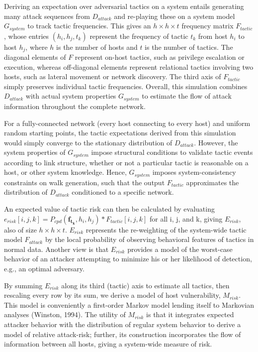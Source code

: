 \documentclass[journal]{IEEEtran}
\begin{document}
Deriving an expectation over adversarial tactics on a system entails generating many attack sequences from $D_{attack}$ and re-playing these on a system model $G_{system}$ to track tactic frequencies. This gives an $h\times h\times t$ frequency matrix $F_{tactic}$, whose entries $(h_{i},h_{j},t_{k} )$ represent the frequency of tactic $t_{k}$ from host $h_{i}$ to host $h_{j}$, where $h$ is the number of hosts and $t$ is the number of tactics. The diagonal elements of $F$ represent on-host tactics, such as privilege escalation or execution, whereas off-diagonal elements represent relational tactics involving two hosts, such as lateral movement or network discovery. The third axis of $F_{tactic}$ simply preserves individual tactic frequencies. Overall, this simulation combines $D_{attack}$ with actual system properties $G_{system}$ to estimate the flow of attack information throughout the complete network.

For a fully-connected network (every host connecting to every host) and uniform random starting points, the tactic expectations derived from this simulation would simply converge to the stationary distribution of $D_{attack}$. However, the system properties of $G_{system}$ impose structural conditions to validate tactic events according to link structure, whether or not a particular tactic is reasonable on a host, or other system knowledge. Hence, $G_{system}$ imposes system-consistency constraints on walk generation, such that the output $F_{tactic}$ approximates the distribution of $D_{attack}$ conditioned to a specific network.

An expected value of tactic risk can then be calculated by evaluating $e_{risk}[i,j,k] = P_{cpd}(\mathbf{f_{t_{k}}},h_{i},h_{j}) * F_{tactic}[i,j,k]$ for all i, j, and k, giving $E_{risk}$, also of size $h \times h \times t$. $E_{risk}$ represents the re-weighting of the system-wide tactic model $F_{attack}$ by the local probability of observing behavioral features of tactics in normal data. Another view is that $E_{risk}$ provides a model of the worst-case behavior of an attacker attempting to minimize his or her likelihood of detection, e.g., an optimal adversary.

By summing $E_{risk}$ along its third (tactic) axis to estimate all tactics, then rescaling every row by its sum, we derive a model of host vulnerability, $M_{risk}$. This model is conveniently a first-order Markov model lending itself to Markovian analyses (Winston, 1994). The utility of $M_{risk}$ is that it integrates expected attacker behavior with the distribution of regular system behavior to derive a model of relative attack-risk; further, its construction incorporates the flow of information between all hosts, giving a system-wide measure of risk.
\end{document}
